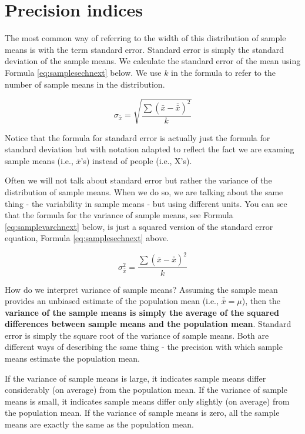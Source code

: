 \documentclass[
]{krantz}
\begin{document}
\hypertarget{precision-indices}{%
\section{Precision indices}\label{precision-indices}}

The most common way of referring to the width of this distribution of sample means is with the term standard error. Standard error is simply the standard deviation of the sample means. We calculate the standard error of the mean using Formula \eqref{eq:samplesechnext} below. We use \(k\) in the formula to refer to the number of sample means in the distribution.

\begin{equation} 
\sigma_{\bar{x}} = \sqrt{\frac{\sum{(\bar{x} - \bar{\bar{x}})^2}}{k}}
      \label{eq:samplesechnext}
\end{equation}

Notice that the formula for standard error is actually just the formula for standard deviation but with notation adapted to reflect the fact we are examing sample means (i.e., \(\bar{x}\)'s) instead of people (i.e., X's).

Often we will not talk about standard error but rather the variance of the distribution of sample means. When we do so, we are talking about the same thing - the variability in sample means - but using different units. You can see that the formula for the variance of sample means, see Formula \eqref{eq:samplevarchnext} below, is just a squared version of the standard error equation, Formula \eqref{eq:samplesechnext} above.

\begin{equation} 
\sigma_{\bar{x}}^2 = \frac{\sum{(\bar{x} - \bar{\bar{x}})^2}}{k}
      \label{eq:samplevarchnext}
\end{equation}

How do we interpret variance of sample means? Assuming the sample mean provides an unbiased estimate of the population mean (i.e., \(\bar{\bar{x}} = \mu\)), then the \textbf{variance of the sample means is simply the average of the squared differences between sample means and the population mean}. Standard error is simply the square root of the variance of sample means. Both are different ways of describing the same thing - the precision with which sample means estimate the population mean.

If the variance of sample means is large, it indicates sample means differ considerably (on average) from the population mean. If the variance of sample means is small, it indicates sample means differ only slightly (on average) from the population mean. If the variance of sample means is zero, all the sample means are exactly the same as the population mean.
\end{document}
